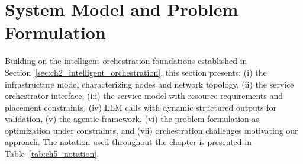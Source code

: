 \section{System Model and Problem Formulation}
\label{sec:ch5_system_model}

Building on the intelligent orchestration foundations established in Section~\ref{sec:ch2_intelligent_orchestration}, this section presents: (i) the infrastructure model characterizing nodes and network topology, (ii) the service orchestrator interface, (iii) the service model with resource requirements and placement constraints, (iv) \ac{LLM} calls with dynamic structured outputs for validation, (v) the agentic framework, (vi) the problem formulation as optimization under constraints, and (vii) orchestration challenges motivating our approach. The notation used throughout the chapter is presented in Table~\ref{tab:ch5_notation}.

